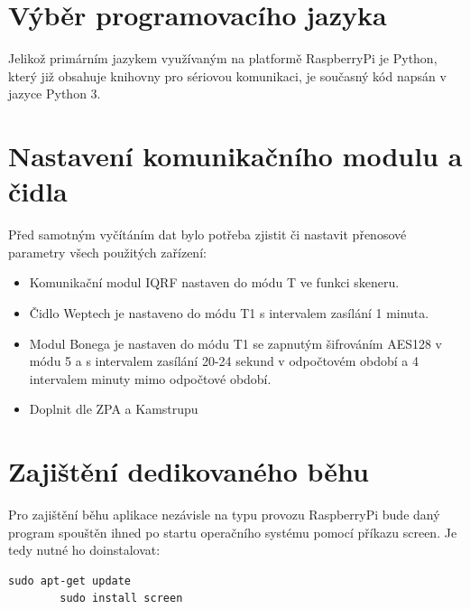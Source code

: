 \section{Výběr programovacího jazyka}
Jelikož primárním jazykem využívaným na platformě RaspberryPi je Python, který již obsahuje knihovny pro sériovou komunikaci, je současný kód napsán v jazyce Python 3.


\section{Nastavení komunikačního modulu a čidla}

Před samotným vyčítáním dat bylo potřeba zjistit či nastavit přenosové parametry všech použitých zařízení:

\begin{itemize}
	\item Komunikační modul IQRF nastaven do módu T ve funkci skeneru.
	\item Čidlo Weptech je nastaveno do módu T1 s intervalem zasílání 1 minuta. 
	\item Modul Bonega je nastaven do módu T1 se zapnutým šifrováním AES128 v módu 5 a s intervalem zasílání 20-24 sekund v odpočtovém období a 4 intervalem minuty mimo odpočtové období.
	\item \colorbox[rgb]{1,0,0}{Doplnit dle ZPA a Kamstrupu}
\end{itemize}


\section{Zajištění dedikovaného běhu}
Pro zajištění běhu aplikace nezávisle na typu provozu RaspberryPi bude daný program spouštěn ihned po startu operačního systému pomocí příkazu screen. Je tedy nutné ho doinstalovat:
 
\begin{lstlisting}[style=MyCodeBash]
		sudo apt-get update
		sudo install screen		
	\end{lstlisting}


